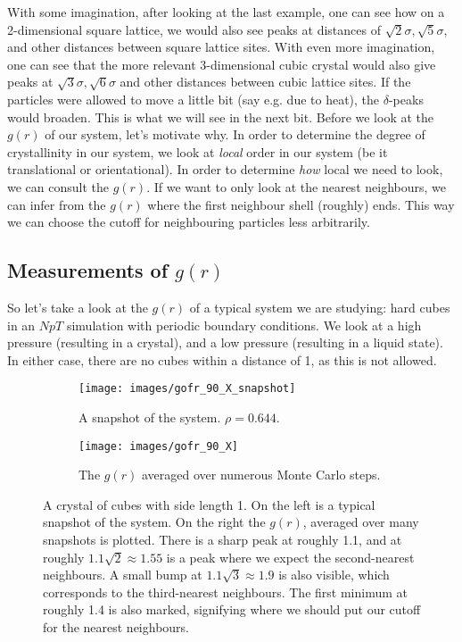 \documentclass[thesis]{subfiles}
\begin{document}
With some imagination, after looking at the last example, one can see how on a 2-dimensional square lattice, we would also see peaks at distances of $\sqrt 2\sigma, \sqrt 5\sigma$, and other distances between square lattice sites. With even more imagination, one can see that the more relevant 3-dimensional cubic crystal would also give peaks at $\sqrt 3 \sigma, \sqrt 6 \sigma$ and other distances between cubic lattice sites.
If the particles were allowed to move a little bit (say e.g. due to heat), the $\delta$-peaks would broaden. This is what we will see in the next bit.
\bigbreak
Before we look at the $g(r)$ of our system, let's motivate why. In order to determine the degree of crystallinity in our system, we look at \emph{local} order in our system (be it translational or orientational). In order to determine \emph{how} local we need to look, we can consult the $g(r)$. If we want to only look at the nearest neighbours, we can infer from the $g(r)$ where the first neighbour shell (roughly) ends. This way we can choose the cutoff for neighbouring particles less arbitrarily.

\subsection{Measurements of \texorpdfstring{$g(r)$}{g(r)}}

So let's take a look at the $g(r)$ of a typical system we are studying: hard cubes in an $NpT$ simulation with periodic boundary conditions. We look at a high pressure (resulting in a crystal), and a low pressure (resulting in a liquid state). In either case, there are no cubes within a distance of 1, as this is not allowed.

\begin{figure}[H]
	\centering
	\begin{subfigure}{0.3\textwidth}
		\centering
		\texttt{[image: images/gofr\_90\_X\_snapshot]}
		\caption{A snapshot of the system. $\rho = 0.644$.}
	\end{subfigure}
	\begin{subfigure}{0.5\textwidth}
		\centering
		\texttt{[image: images/gofr\_90\_X]}
		\caption{The $g(r)$ averaged over numerous Monte Carlo steps.}
		\label{fig:gofr_crystal_b}
	\end{subfigure}
	\caption{A crystal of cubes with side length 1. On the left is a typical snapshot of the system. On the right the $g(r)$, averaged over many  snapshots is plotted. There is a sharp peak at roughly 1.1, and at roughly $1.1 \sqrt 2 \approx 1.55$ is a peak where we expect the second-nearest neighbours. A small bump at $1.1 \sqrt 3 \approx 1.9$ is also visible, which corresponds to the third-nearest neighbours. The first minimum at roughly 1.4 is also marked, signifying where we should put our cutoff for the nearest neighbours.}
\end{figure}
\end{document}
